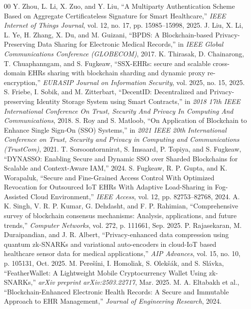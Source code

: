 \documentclass[conference]{IEEEtran}
\begin{document}
\begin{thebibliography}{00}
 Y. Zhou, L. Li, X. Zuo, and Y. Liu, ``A Multiparty Authentication Scheme Based on Aggregate Certificateless Signature for Smart Healthcare,'' \textit{IEEE Internet of Things Journal}, vol. 12, no. 17, pp. 15985--15998, 2025.
 J. Liu, X. Li, L. Ye, H. Zhang, X. Du, and M. Guizani, ``BPDS: A Blockchain-based Privacy-Preserving Data Sharing for Electronic Medical Records,'' in \textit{IEEE Global Communications Conference (GLOBECOM)}, 2017.
 K. Thirasak, D. Chainarong, T. Chuaphanngam, and S. Fugkeaw, ``SSX-EHRs: secure and scalable cross-domain EHRs sharing with blockchain sharding and dynamic proxy re-encryption,'' \textit{EURASIP Journal on Information Security}, vol. 2025, no. 15, 2025.
 S. Friebe, I. Sobik, and M. Zitterbart, ``DecentID: Decentralized and Privacy-preserving Identity Storage System using Smart Contracts,'' in \textit{2018 17th IEEE International Conference On Trust, Security And Privacy In Computing And Communications}, 2018.
 S. Roy and S. Matloob, ``On Application of Blockchain to Enhance Single Sign-On (SSO) Systems,'' in \textit{2021 IEEE 20th International Conference on Trust, Security and Privacy in Computing and Communications (TrustCom)}, 2021.
 T. Sorsoontornnirat, S. Imsaard, P. Topiya, and S. Fugkeaw, ``DYNASSO: Enabling Secure and Dynamic SSO over Sharded Blockchains for Scalable and Context-Aware IAM,'' 2024.
 S. Fugkeaw, R. P. Gupta, and K. Worapaluk, ``Secure and Fine-Grained Access Control With Optimized Revocation for Outsourced IoT EHRs With Adaptive Load-Sharing in Fog-Assisted Cloud Environment,'' \textit{IEEE Access}, vol. 12, pp. 82753--82768, 2024.
 A. K. Singh, V. R. P. Kumar, G. Dehdasht, and F. P. Rahimian, ``Comprehensive survey of blockchain consensus mechanisms: Analysis, applications, and future trends,'' \textit{Computer Networks}, vol. 272, p. 111661, Sep. 2025.
 P. Rajasekaran, M. Duraipandian, and J. R. Albert, ``Privacy-enhanced data compression using quantum zk-SNARKs and variational auto-encoders in cloud-IoT based healthcare sensor data for medical applications,'' \textit{AIP Advances}, vol. 15, no. 10, p. 105131, Oct. 2025.
 M. Pere\v{s}\'{i}ni, I. Homoliak, S. Olek\v{s}\'{a}k, and S. Sl\'{a}vka, ``FeatherWallet: A Lightweight Mobile Cryptocurrency Wallet Using zk-SNARKs,'' \textit{arXiv preprint arXiv:2503.22717}, Mar. 2025.
 M. A. Eltabakh et al., ``Blockchain-Enhanced Electronic Health Records: A Secure and Immutable Approach to EHR Management,'' \textit{Journal of Engineering Research}, 2024.

\end{thebibliography}
\end{document}
